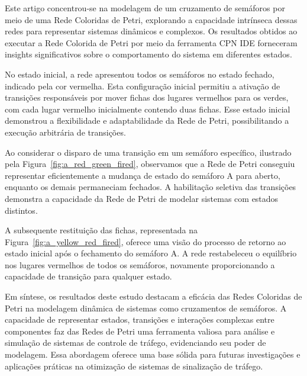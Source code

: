 Este artigo concentrou-se na modelagem de um cruzamento de semáforos por meio de uma Rede Coloridas de Petri, explorando a capacidade intrínseca dessas redes para representar sistemas dinâmicos e complexos.
Os resultados obtidos ao executar a Rede Colorida de Petri por meio da ferramenta CPN IDE forneceram insights significativos sobre o comportamento do sistema em diferentes estados.

No estado inicial, a rede apresentou todos os semáforos no estado fechado, indicado pela cor vermelha.
Esta configuração inicial permitiu a ativação de transições responsáveis por mover fichas dos lugares vermelhos para os verdes, com cada lugar vermelho inicialmente contendo duas fichas.
Esse estado inicial demonstrou a flexibilidade e adaptabilidade da Rede de Petri, possibilitando a execução arbitrária de transições.

Ao considerar o disparo de uma transição em um semáforo específico, ilustrado pela Figura~\ref{fig:a_red_green_fired}, observamos que a Rede de Petri conseguiu representar eficientemente a mudança de estado do semáforo A para aberto, enquanto os demais permaneciam fechados.
A habilitação seletiva das transições demonstra a capacidade da Rede de Petri de modelar sistemas com estados distintos.

A subsequente restituição das fichas, representada na Figura~\ref{fig:a_yellow_red_fired}, oferece uma visão do processo de retorno ao estado inicial após o fechamento do semáforo A.
A rede restabeleceu o equilíbrio nos lugares vermelhos de todos os semáforos, novamente proporcionando a capacidade de transição para qualquer estado.

Em síntese, os resultados deste estudo destacam a eficácia das Redes Coloridas de Petri na modelagem dinâmica de sistemas como cruzamentos de semáforos.
A capacidade de representar estados, transições e interações complexas entre componentes faz das Redes de Petri uma ferramenta valiosa para análise e simulação de sistemas de controle de tráfego, evidenciando seu poder de modelagem.
Essa abordagem oferece uma base sólida para futuras investigações e aplicações práticas na otimização de sistemas de sinalização de tráfego.